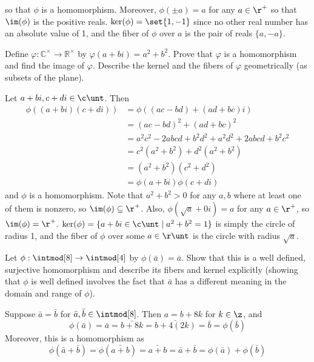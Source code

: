 \begin{problems}
\begin{sol}
        so that $\phi$ is a homomorphism. Moreover, $\phi(\pm a) = a$ for any $a \in \r^+$ so that $\im(\phi)$ is the positive reals. $\ker(\phi) = \set{1, -1}$ since no other real number has an absolute value of 1, and the fiber of $\phi$ over $a$ is the pair of reals $\{a, -a\}$.
    \end{sol}
    \item Define $\varphi : \mathbb{C}^{\times} \to \mathbb{R}^{\times}$ by $\varphi(a+bi) = a^2 + b^2$. Prove that $\varphi$ is a homomorphism and find the image of $\varphi$. Describe the kernel and the fibers of $\varphi$ geometrically (as subsets of the plane).
    \begin{sol}
        Let $a + bi, c + di \in \c\unt$. Then
        \begin{align*}
            \phi((a + bi)(c + di)) & = \phi((ac - bd) + (ad + bc)i) \\
            & = (ac - bd)^2 + (ad + bc)^2 \\
            & = a^2c^2 - 2abcd + b^2d^2 + a^2d^2 + 2abcd + b^2c^2 \\
            & = c^2(a^2 + b^2) + d^2(a^2 + b^2) \\
            & = (a^2 + b^2)(c^2 + d^2) \\
            & = \phi(a + bi)\phi(c + di)
        \end{align*}
        and $\phi$ is a homomorphism. Note that $a^2 + b^2 > 0$ for any $a, b$ where at least one of them is nonzero, so $\im(\phi) \subseteq \r^+$. Also, $\phi(\sqrt a + 0i) = a$ for any $a \in \r^+$, so $\im(\phi) = \r^+$. $\ker(\phi) = \{a + bi \in \c\unt \mid a^2 + b^2 = 1\}$ is simply the circle of radius 1, and the fiber of $\phi$ over some $a \in \r\unt$ is the circle with radius $\sqrt a$.
    \end{sol}
    \item Let $\phi : \intmod[8] \to \intmod[4]$ by $\phi(\bar  a) = \bar  a$. Show that this is a well defined, surjective homomorphism and describe its fibers and kernel explicitly (showing that $\phi$ is well defined involves the fact that $\bar  a$ has a different meaning in the domain and range of $\phi$).
    \begin{sol}
        Suppose $\bar  a = \bar  b$ for $\bar  a, \bar  b \in \intmod[8]$. Then $a = b + 8k$ for $k \in \z$, and
        \[\phi(\bar  a) = \bar  a = \bar{b + 8k} = \bar{b + 4(2k)} = \bar  b = \phi(\bar  b)\]
        Moreover, this is a homomorphism as
        \[\phi(\bar  a + \bar  b) = \phi(\bar{a + b}) = \bar{a + b} = \bar  a + \bar  b = \phi(\bar  a) + \phi(\bar  b)\]

\end{sol}
\end{problems}
